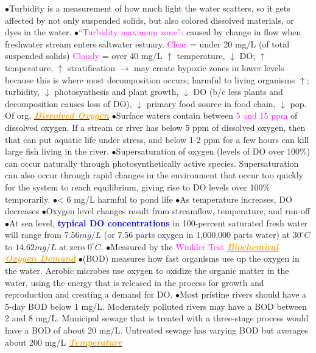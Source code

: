 \documentclass{article}
\newcommand{\ddd}{$\bullet$}
\newcommand{\blue}[1]{\textcolor{blue}{#1}}
\newcommand{\pink}[1]{\textcolor{magenta}{#1}}
\newcommand{\orange}[1]{\textcolor{orange}{#1}}
\newcommand{\mysubsection}[1]{\underline{\textbf{{\textit{\orange{#1}}}}}}
\newcommand{\vocab}[1]{{\pink{#1}}}
\begin{document}
\begin{multicols*}{4}
            \ddd Turbidity is a measurement of how much light the water scatters, so it gets affected by not only suspended solids, but also colored dissolved materials, or dyes in the water.
            \ddd \vocab{“Turbidity maximum zone”: }caused by change in flow when freshwater stream enters saltwater estuary. \pink{Clear} = under 20 mg/L (of total suspended solids) \pink{Cloudy} = over 40 mg/L $ \uparrow $ temperature, $ \downarrow $ DO; $ \uparrow $ temperature, $ \uparrow $ stratification $ \rightarrow $ may create hypoxic zones in lower levels because this is where most decomposition occurs; harmful to living organisms $ \uparrow $; turbidity, $ \downarrow $ photosynthesis and plant growth,  $ \downarrow $ DO (b/c less plants and decomposition causes loss of DO), $ \downarrow $ primary food source in food chain, $ \downarrow $ pop. Of org,
        \mysubsection{Dissolved Oxygen}
            \ddd Surface waters contain between \pink{5 and 15 ppm} of dissolved oxygen. If a stream or river has below 5 ppm of dissolved oxygen, then that can put aquatic life under stress, and below 1-2 ppm for a few hours can kill large fish living in the river.
            \ddd Supersaturation of oxygen (levels of DO over 100\%) can occur naturally through photosynthetically active species. Supersaturation can also occur through rapid changes in the environment that occur too quickly for the system to reach equilibrium, giving rise to DO levels over 100\% temporarily.
            \ddd < 6 mg/L harmful to pond life
            \ddd As temperature increases, DO decreases
            \ddd Oxygen level changes result from streamflow, temperature, and run-off
            \ddd At sea level, \textbf{\blue{typical DO concentrations}} in 100-percent saturated fresh water will range from $7.56 mg/L$ (or 7.56 parts oxygen in 1,000,000 parts water) at $30^\circ C$ to $14.62 mg/L$ at zero $0^\circ C$.
            \ddd Measured by the \vocab{Winkler Test}
        \mysubsection{Biochemical Oxygen Demand}
            \ddd (BOD) measures how fast organisms use up the oxygen in the water. Aerobic microbes use oxygen to oxidize the organic matter in the water, using the energy that is released in the process for growth and reproduction and creating a demand for DO.
            \ddd Most pristine rivers should have a 5-day BOD below 1 mg/L. Moderately polluted rivers may have a BOD between 2 and 8 mg/L. Municipal sewage that is treated with a three-stage process would have a BOD of about 20 mg/L. Untreated sewage has varying BOD but averages about 200 mg/L    
        \mysubsection{Temperature}

\end{multicols*}
\end{document}
